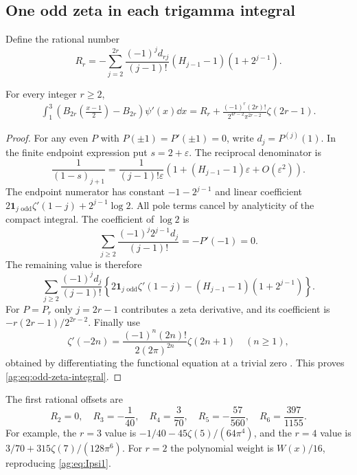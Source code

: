 \subsection{One odd zeta in each trigamma integral}
Define the rational number
\begin{equation}\label{ag:eq:Rr}
 R_r=-\sum_{j=2}^{2r}\frac{(-1)^jd_{rj}}{(j-1)!}
                         (H_{j-1}-1)(1+2^{j-1}).
\end{equation}
\begin{corollary}
\label{ag:cor:odd-zeta}
For every integer $r\ge2$,
\begin{align}
 \boxed{\displaystyle
 \int_1^3\left(B_{2r}\left(\frac{x-1}{2}\right)-B_{2r}\right)
                                  \psi'(x)\dd x
 =R_r+\frac{(-1)^r(2r)!}{2^{4r-2}\pi^{2r-2}}\zeta(2r-1).}
 \label{ag:eq:odd-zeta-integral}
\end{align}
\end{corollary}
\begin{proof}
For any even $P$ with $P(\pm1)=P'(\pm1)=0$, write
$d_j=P^{(j)}(1)$. In the finite endpoint expression put
$s=2+\varepsilon$. The reciprocal denominator is
\[
 \frac1{(1-s)_{j+1}}
 =\frac1{(j-1)!\varepsilon}
     \left(1+(H_{j-1}-1)\varepsilon+O(\varepsilon^2)\right).
\]
The endpoint numerator has constant $-1-2^{j-1}$ and linear coefficient
$2\mathbf1_{j\text{ odd}}\zeta'(1-j)+2^{j-1}\log2$.
All pole terms cancel by analyticity of the compact integral.
The coefficient of $\log2$ is
\[
 \sum_{j\ge2}\frac{(-1)^j2^{j-1}d_j}{(j-1)!}=-P'(-1)=0.
\]
The remaining value is therefore
\[
 \sum_{j\ge2}\frac{(-1)^jd_j}{(j-1)!}
 \left\{2\mathbf1_{j\text{ odd}}\zeta'(1-j)
                     -(H_{j-1}-1)(1+2^{j-1})\right\}.
\]
For $P=P_r$ only $j=2r-1$ contributes a zeta derivative, and its
coefficient is $-r(2r-1)/2^{2r-2}$. Finally use
\[
 \zeta'(-2n)=\frac{(-1)^n(2n)!}{2(2\pi)^{2n}}\zeta(2n+1)
 \quad(n\ge1),
\]
obtained by differentiating the functional equation at a trivial zero
\cite{DLMFintegers}. This proves \eqref{ag:eq:odd-zeta-integral}.
\end{proof}

The first rational offsets are
\[
 R_2=0,\quad R_3=-\frac1{40},\quad R_4=\frac3{70},\quad
 R_5=-\frac{57}{560},\quad R_6=\frac{397}{1155}.
\]
For example, the $r=3$ value is
$-1/40-45\zeta(5)/(64\pi^4)$, and the $r=4$ value is
$3/70+315\zeta(7)/(128\pi^6)$.
For $r=2$ the polynomial weight is $W(x)/16$, reproducing
\eqref{ag:eq:Ipsi1}.

